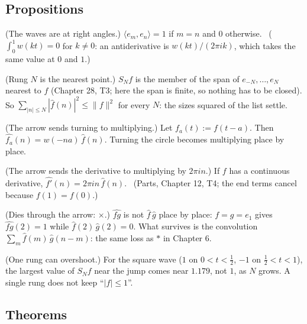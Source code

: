 \subsection*{Propositions}

\begin{lines}
\item[\lab{P1}] (The waves are at right angles.) $\langle e_m, e_n \rangle = 1$ if $m = n$ and $0$ otherwise. \ ($\int_0^1 w(k t) = 0$ for $k \ne 0$: an antiderivative is $w(kt)/(2\pi i k)$, which takes the same value at $0$ and $1$.)
\item[\lab{P2}] (Rung $N$ is the nearest point.) $S_N f$ is the member of the span of $e_{-N}, \dots, e_N$ nearest to $f$ (Chapter 28, T3; here the span is finite, so nothing has to be closed). So $\sum_{|n| \le N} |\widehat{f}(n)|^2 \le \|f\|^2$ for every $N$: the sizes squared of the list settle.
\item[\lab{P3}] (The arrow sends turning to multiplying.) Let $f_a(t) := f(t - a)$. Then $\widehat{f_a}(n) = w(-n a)\, \widehat{f}(n)$. Turning the circle becomes multiplying place by place.
\item[\lab{P4}] (The arrow sends the derivative to multiplying by $2\pi i n$.) If $f$ has a continuous derivative, $\widehat{f'}(n) = 2\pi i n\, \widehat{f}(n)$. \ (Parts, Chapter 12, T4; the end terms cancel because $f(1) = f(0)$.)
\item[\lab{P5}] (Dies through the arrow: $\times$.) $\widehat{f g}$ is not $\widehat f\, \widehat g$ place by place: $f = g = e_1$ gives $\widehat{fg}(2) = 1$ while $\widehat f(2)\, \widehat g(2) = 0$. What survives is the convolution $\sum_m \widehat f(m)\, \widehat g(n - m)$: the same loss as $\ast$ in Chapter 6.
\item[\lab{P6}] (One rung can overshoot.) For the square wave ($1$ on $0 < t < \tfrac12$, $-1$ on $\tfrac12 < t < 1$), the largest value of $S_N f$ near the jump comes near $1.179$, not $1$, as $N$ grows. A single rung does not keep ``$|f| \le 1$''.
\end{lines}

\subsection*{Theorems}

